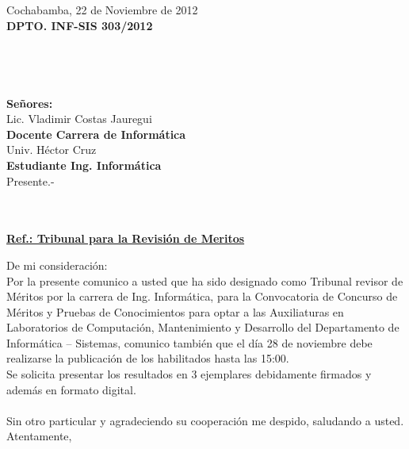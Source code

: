 \documentclass[letterpaper,11pt]{letter}
\begin{document}
Cochabamba, 22 de Noviembre de 2012~\\
 \textbf{DPTO. INF-SIS 303/2012}\\
~\\
~\\
~\\
~\\
 \textbf{Señores:}~\\
Lic. Vladimir Costas Jauregui~\\
 \textbf{Docente Carrera de Informática}~\\
Univ. Héctor Cruz~\\
 \textbf{Estudiante Ing. Informática}~\\
Presente.-\\
~\\
~\\
\begin{center}
\underline{ \textbf{Ref.: Tribunal para la Revisión de Meritos}}
\end{center}
De mi consideración:\\
Por la presente comunico a usted que ha sido designado como Tribunal revisor de Méritos por la carrera de Ing. Informática, para la Convocatoria de Concurso de Méritos y Pruebas de Conocimientos para optar a las Auxiliaturas en Laboratorios de Computación, Mantenimiento y Desarrollo del Departamento de Informática – Sistemas, comunico también que el día 28 de noviembre debe realizarse la publicación de los habilitados hasta las 15:00.\\
Se solicita presentar los resultados en 3 ejemplares debidamente firmados y además en formato digital.\\
~\\
Sin otro particular y agradeciendo su cooperación me despido, saludando a usted.\\
Atentamente,\\
\end{document}
